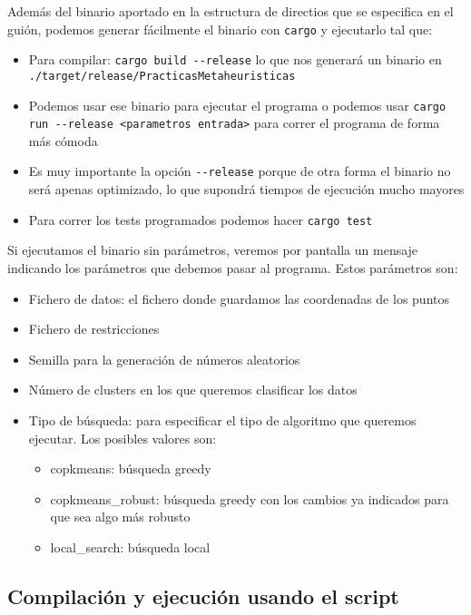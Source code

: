 \documentclass[11pt]{article}
\begin{document}
Además del binario aportado en la estructura de directios que se especifica en el guión, podemos generar fácilmente el binario con \lstinline{cargo} y ejecutarlo tal que:

\begin{itemize}
    \item Para compilar: \lstinline{cargo build --release} lo que nos generará un binario en \lstinline{./target/release/PracticasMetaheuristicas}
    \item Podemos usar ese binario para ejecutar el programa o podemos usar \lstinline{cargo run --release <parametros entrada>} para correr el programa de forma más cómoda
    \item Es muy importante la opción \lstinline{--release} porque de otra forma el binario no será apenas optimizado, lo que supondrá tiempos de ejecución mucho mayores
    \item Para correr los tests programados podemos hacer \lstinline{cargo test}
\end{itemize}

Si ejecutamos el binario sin parámetros, veremos por pantalla un mensaje indicando los parámetros que debemos pasar al programa. Estos parámetros son:

\begin{itemize}
    \item Fichero de datos: el fichero donde guardamos las coordenadas de los puntos
    \item Fichero de restricciones
    \item Semilla para la generación de números aleatorios
    \item Número de clusters en los que queremos clasificar los datos
    \item Tipo de búsqueda: para especificar el tipo de algoritmo que queremos ejecutar. Los posibles valores son:
    \begin{itemize}
        \item copkmeans: búsqueda greedy
        \item copkmeans\_robust: búsqueda greedy con los cambios ya indicados para que sea algo más robusto
        \item local\_search: búsqueda local
    \end{itemize}
\end{itemize}

\subsection{Compilación y ejecución usando el script}
\end{document}
